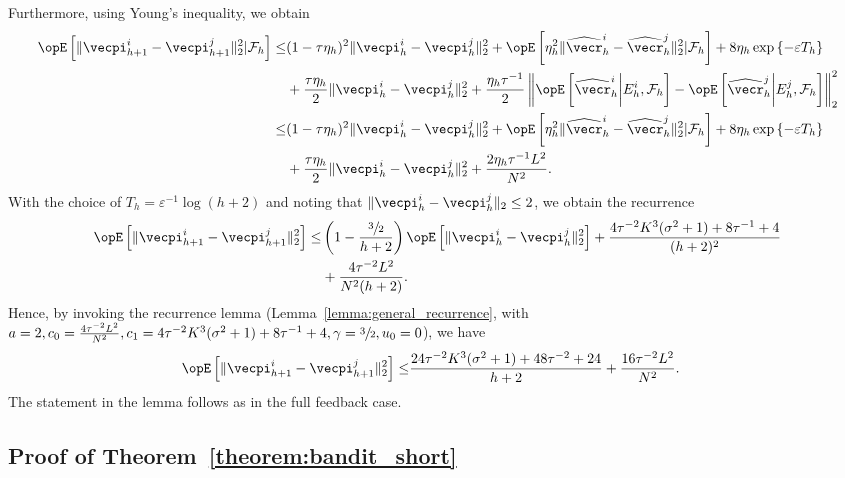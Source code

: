 Furthermore, using Young's inequality, we obtain
\begin{align*}
    \Exop \left[ \| \vecpi^i_{h+1} - \vecpi^j_{h+1} \|_2^2 | \mathcal{F}_h \right] \leq & (1 - \tau \eta_h)^2 \| \vecpi^i_h - \vecpi^j_h \|_2^2 + \Exop \left[ \eta_h^2 \|  \widehat{\vecr}_h^i - \widehat{\vecr}_h^j \|_2^2 | \mathcal{F}_h \right] + 8 \eta_h \exp\left\{ -\varepsilon T_{h}\right\} \\
        &+ \frac{\tau\eta_h}{2} \|\vecpi^i_h - \vecpi^j_h\|_2^2 + \frac{ \eta_h\tau^{-1}}{2}\left\| \Exop\left[\widehat{\vecr}_h^i \middle|E_{h}^i, \mathcal{F}_h\right] - \Exop\left[\widehat{\vecr}_h^j \middle|E_{h}^j, \mathcal{F}_h\right] \right\|_2^2 \\
     \leq & (1 - \tau \eta_h)^2 \| \vecpi^i_h - \vecpi^j_h \|_2^2 + \Exop \left[ \eta_h^2 \|  \widehat{\vecr}_h^i - \widehat{\vecr}_h^j \|_2^2 | \mathcal{F}_h \right] + 8 \eta_h \exp\left\{ -\varepsilon T_{h}\right\} \\
        &+ \frac{\tau\eta_h}{2} \|\vecpi^i_h - \vecpi^j_h\|_2^2 + \frac{2\eta_h\tau^{-1} L ^ 2}{N^2}.
\end{align*}
With the choice of $T_h = \varepsilon^{-1} \log (h+2)$ and noting that $\| \vecpi^i_{h} - \vecpi_h^j\|_2 \leq 2$, we obtain the recurrence
\begin{align*}
    \Exop \left[ \| \vecpi^i_{h+1} - \vecpi^j_{h+1} \|^2_2 \right] \leq & \left(1 - \frac{\sfrac{3}{2}}{h+2}\right) \Exop \left[ \| \vecpi^i_h - \vecpi^j_h \|_2^2\right] + \frac{4\tau^{-2} K^3 (\sigma^2 + 1) + 8\tau^{-1} + 4}{(h+2)^2}   \\
        & + \frac{4\tau^{-2} L ^ 2}{N^2 (h+2)}.
\end{align*}
Hence, by invoking the recurrence lemma (Lemma~\ref{lemma:general_recurrence}, with $a=2, c_0 = \frac{4\tau^{-2} L ^ 2}{N^2}, c_1 = 4\tau^{-2} K^3 (\sigma^2 + 1) + 8\tau^{-1} + 4, \gamma = \sfrac{3}{2}, u_0 = 0$), we have
\begin{align*}
    \Exop \left[ \| \vecpi^i_{h+1} - \vecpi^j_{h+1} \|_2^2 \right] \leq & \frac{24\tau^{-2} K^3 (\sigma^2 + 1) + 48\tau^{-2} + 24}{h+2} + \frac{16\tau^{-2} L ^ 2}{N^2}.
\end{align*}
The statement in the lemma follows as in the full feedback case.

\subsection{Proof of Theorem~\ref{theorem:bandit_short}}\label{sec:bandit_theorem_full}

